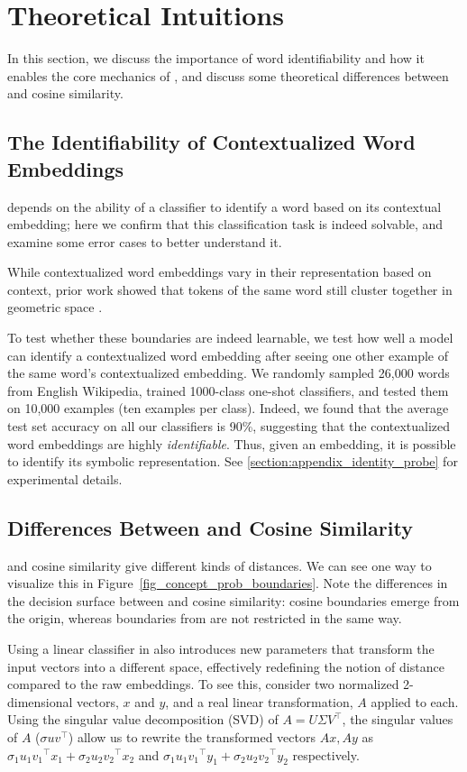 \section{Theoretical Intuitions}

In this section, we discuss the importance of word identifiability and how it enables the core mechanics of \wc, and discuss some theoretical differences between \wc and cosine similarity.  

\subsection{The Identifiability of Contextualized Word Embeddings}

\wc depends on the ability of a classifier to identify a word based on its contextual embedding; here we confirm that this classification task is indeed solvable, and examine some error cases to better understand it.

While contextualized word embeddings vary in their representation based on context, prior work showed that tokens of the same word still cluster together in geometric space \cite{zhou-etal-2022-problems}.

To test whether these boundaries are indeed learnable, we test how well a model can identify a contextualized word embedding after seeing one other example of the same word's contextualized embedding. We randomly sampled 26,000 words from English Wikipedia, trained 1000-class one-shot classifiers, and tested them on 10,000 examples (ten examples per class). Indeed, we found that the average test set accuracy on all our classifiers is 90\%, suggesting that the contextualized word embeddings are highly \textit{identifiable}. Thus, given an embedding, it is possible to identify its symbolic representation. See \ref{section:appendix_identity_probe} for experimental details.

\subsection{Differences Between \wc and Cosine Similarity}

\wc and cosine similarity give different kinds of distances.
We can see one way to visualize this in Figure~\ref{fig_concept_prob_boundaries}. Note the differences in the decision surface between {\wc} and cosine similarity: cosine boundaries emerge from the origin, whereas boundaries from \wc are not restricted in the same way.

Using a linear classifier in \wc also introduces new parameters that transform the input vectors into a different space, effectively redefining the notion of distance compared to the raw embeddings. To see this, consider two normalized 2-dimensional vectors, $x$ and $y$, and a real linear transformation, $A$ applied to each. Using the singular value decomposition (SVD) of $A= U \Sigma {V}^\intercal$, the singular values of $A$ (${\sigma}{u}{{v}^\intercal}$) allow us to rewrite the transformed vectors $Ax, Ay$ as ${\sigma_1}{u_1}{{v_1}^\intercal}{x_1} + {\sigma_2}{u_2}{{v_2}^\intercal}{x_2}$ and  ${\sigma_1}{u_1}{{v_1}^\intercal}{y_1} + {\sigma_2}{u_2}{{v_2}^\intercal}{y_2}$ respectively. 

